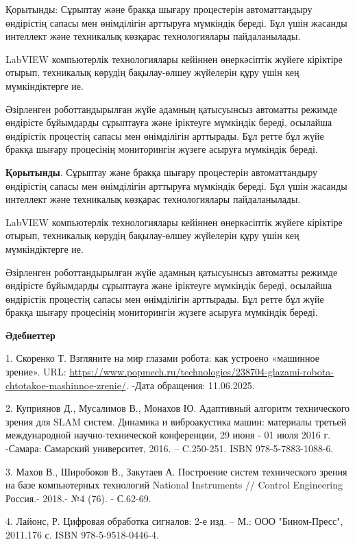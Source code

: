 Қорытынды: Сұрыптау және бракқа шығару процестерін автоматтандыру
өндірістің сапасы мен өнімділігін арттыруға мүмкіндік береді. Бұл үшін
жасанды интеллект және техникалық көзқарас технологиялары пайдаланылады.

LabVIEW компьютерлік технологиялары кейіннен өнеркәсіптік жүйеге
кіріктіре отырып, техникалық көрудің бақылау-өлшеу жүйелерін құру үшін
кең мүмкіндіктерге ие.

Әзірленген роботтандырылған жүйе адамның қатысуынсыз автоматты режимде
өндірісте бұйымдарды сұрыптауға және іріктеуге мүмкіндік береді,
осылайша өндірістік процестің сапасы мен өнімділігін арттырады. Бұл
ретте бұл жүйе бракқа шығару процесінің мониторингін жүзеге асыруға
мүмкіндік береді.

{\bfseries Қорытынды}. Сұрыптау және бракқа шығару процестерін
автоматтандыру өндірістің сапасы мен өнімділігін арттыруға мүмкіндік
береді. Бұл үшін жасанды интеллект және техникалық көзқарас
технологиялары пайдаланылады.

LabVIEW компьютерлік технологиялары кейіннен өнеркәсіптік жүйеге
кіріктіре отырып, техникалық көрудің бақылау-өлшеу жүйелерін құру үшін
кең мүмкіндіктерге ие.

Әзірленген роботтандырылған жүйе адамның қатысуынсыз автоматты режимде
өндірісте бұйымдарды сұрыптауға және іріктеуге мүмкіндік береді,
осылайша өндірістік процестің сапасы мен өнімділігін арттырады. Бұл
ретте бұл жүйе бракқа шығару процесінің мониторингін жүзеге асыруға
мүмкіндік береді.

{\bfseries Әдебиеттер}

1. Скоренко Т. Взгляните на мир глазами робота: как устроено «машинное
зрение». URL:
\url{https://www.popmech.ru/technologies/238704-glazami-robota-chtotakoe-mashinnoe-zrenie/}.
-Дата обращения: 11.06.2025.

2. Куприянов Д., Мусалимов В., Монахов Ю. Адаптивный алгоритм
технического зрения для SLAM систем. Динамика и виброакустика машин:
материалы третьей международной научно-технической конференции, 29 июня
- 01 июля 2016 г. -Самара: Самарский университет, 2016. -- C.250-251.
ISBN 978-5-7883-1088-6.

3. Махов В., Широбоков В., Закутаев А. Построение систем технического
зрения на базе компьютерных технологий National Instruments // Control
Engineering Россия.- 2018.- №4 (76). - С.62-69.

4. Лайонс, Р. Цифровая обработка сигналов: 2-е изд. -- М.: ООО
"Бином-Пресс", 2011.176 с. ISBN 978-5-9518-0446-4.


